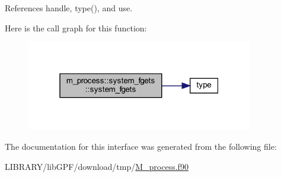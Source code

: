 References handle, type(), and use.

Here is the call graph for this function\+:
\nopagebreak
\begin{figure}[H]
\begin{center}
\leavevmode
\includegraphics[width=280pt]{interfacem__process_1_1system__fgets_a33f5f4ba1ea0fe4e0b757d7fa5e8a571_cgraph}
\end{center}
\end{figure}


The documentation for this interface was generated from the following file\+:\begin{DoxyCompactItemize}
\item 
L\+I\+B\+R\+A\+R\+Y/lib\+G\+P\+F/download/tmp/\hyperlink{M__process_8f90}{M\+\_\+process.\+f90}\end{DoxyCompactItemize}
